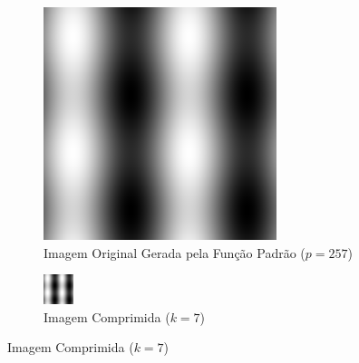 \documentclass[12pt, a4paper]{article}
\begin{document}
\begin{figure}[H]
    \centering
    \begin{subfigure}[b]{0.45\textwidth}
        \centering
        \includegraphics[width=\textwidth]{results/case_5/base_image.png}
        \caption{Imagem Original Gerada pela Função Padrão ($p=257$)}
        \label{fig:zoo_original_gray}
    \end{subfigure}
    \hfill
    \begin{subfigure}[b]{0.45\textwidth}
        \centering
        \includegraphics[width=\textwidth]{results/case_5/compressed_k7.png}
        \caption{Imagem Comprimida ($k=7$)}
        \label{fig:zoo_compressed_k7}
    \end{subfigure}
    

\end{figure}
\end{document}
